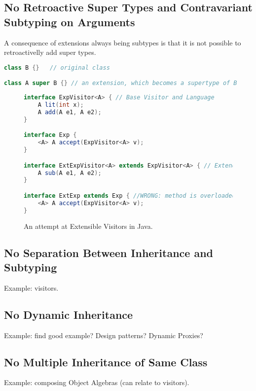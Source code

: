 \subsection{No Retroactive Super Types and Contravariant Subtyping on Arguments}

A consequence of extensions always being subtypes is that it is not
possible to retroactivelly add super types. 

\begin{lstlisting}[language=java]
class B {}   // original class

class A super B {} // an extension, which becomes a supertype of B
\end{lstlisting}

\begin{figure}
\begin{lstlisting}[language=java]
interface ExpVisitor<A> { // Base Visitor and Language
	A lit(int x);
	A add(A e1, A e2);
}

interface Exp {
	<A> A accept(ExpVisitor<A> v);
}

interface ExtExpVisitor<A> extends ExpVisitor<A> { // Extended Visitor and Language
	A sub(A e1, A e2);
}

interface ExtExp extends Exp { //WRONG: method is overloaded, not overriden!
	<A> A accept(ExpVisitor<A> v); 
}
\end{lstlisting}
\caption{An attempt at Extensible Visitors in Java.}
\label{fig:JVis}
\end{figure}


\subsection{No Separation Between Inheritance and Subtyping}

Example: visitors.



\subsection{No Dynamic Inheritance}

Example: find good example? Design patterns? Dynamic Proxies?


\subsection{No Multiple Inheritance of Same Class}

Example: composing Object Algebras (can relate to visitors).

